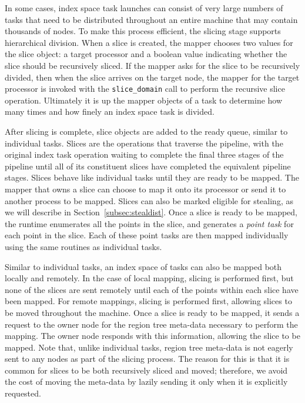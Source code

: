 In some cases, index space task launches can 
consist of very large numbers of tasks that need
to be distributed throughout an entire machine
that may contain thousands of nodes. To make
this process efficient, the slicing stage 
supports hierarchical division.  When a slice
is created, the mapper chooses two values for
the slice object: a target processor and a
boolean value indicating whether the slice
should be recursively sliced. If the mapper
asks for the slice to be recursively divided,
then when the slice arrives on the target
node, the mapper for the target processor is
invoked with the {\tt slice\_domain} call
to perform the recursive slice operation.
Ultimately it is up the mapper objects of
a task to determine how many times and how
finely an index space task is divided.

After slicing is complete, slice objects
are added to the ready queue, similar to 
individual tasks. Slices are the operations 
that traverse the pipeline, with the original 
index task operation waiting to complete
the final three stages of the pipeline until 
all of its constituent slices have completed 
the equivalent pipeline stages.
Slices behave like individual tasks until
they are ready to be mapped. The mapper that 
owns a slice can choose to map it onto its
processor or send it to another process to
be mapped. Slices can also be marked eligible
for stealing, as we will describe in 
Section~\ref{subsec:stealdist}. Once a slice
is ready to be mapped, the runtime enumerates
all the points in the slice, and generates
a {\em point task} for each point in the
slice. Each of these point tasks are then
mapped individually using the same routines
as individual tasks. 

Similar to individual tasks, an index space
of tasks can also be mapped both locally
and remotely. In the case of local mapping,
slicing is performed first, but none of the
slices are sent remotely until each of the
points within each slice have been mapped.
For remote mappings, slicing is performed
first, allowing slices to be moved throughout
the machine.  Once a slice is ready to be
mapped, it sends a request to the owner
node for the region tree meta-data necessary
to perform the mapping. The owner node
responds with this information, allowing
the slice to be mapped. Note that, unlike
individual tasks, region tree meta-data
is not eagerly sent to any nodes as part
of the slicing process.  The reason for this
is that it is common for slices to be
both recursively sliced and moved; therefore,
we avoid the cost of moving the meta-data
by lazily sending it only when it is 
explicitly requested.


